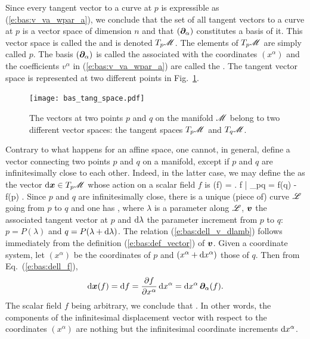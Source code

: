\ee
Since every tangent vector to a curve at $p$ is expressible as (\ref{e:bas:v_va_wpar_a}), we conclude that
the set of all tangent vectors to a curve at $p$ is a vector space of dimension $n$ and that $(\bm{\partial}_\alpha)$ constitutes a basis of it. This vector space is
called the
 and is denoted $T_p\mathscr{M}$.
The elements of $T_p\mathscr{M}$ are simply called  $p$.
The basis $(\bm{\partial}_\alpha)$ is called the  associated with
the coordinates $(x^\alpha)$ and the coefficients $v^\alpha$ in (\ref{e:bas:v_va_wpar_a}) are called the .
The tangent vector space is represented at two different points in Fig.~\ref{f:bas:tang_space}.

\begin{figure}
\centerline{\texttt{[image: bas\_tang\_space.pdf]}}
\caption[]{\label{f:bas:tang_space} \footnotesize
The vectors at two points $p$ and $q$ on the
manifold $\mathscr{M}$ belong to two different vector spaces:
the tangent spaces $T_p\mathscr{M}$ and $T_q\mathscr{M}$.}
\end{figure}

Contrary to what happens for an affine space, one cannot, in general, define a vector connecting two points $p$ and $q$ on a manifold, except if $p$ and $q$ are infinitesimally close to each other. Indeed, in the latter case, we may define
the  as the vector $\mathrm{d}\bm{x}\in{{T_p\mathscr{M}}}$ whose action on a scalar field $f$ is
\be \label{e:bas:dell_f}
  \D{}(f) = \left. \D f \right| _{p\rightarrow q} = f(q) - f(p) .
\ee
Since $p$ and $q$ are infinitesimally close, there is a unique (piece of) curve
$\mathscr{L}$ going
from $p$ to $q$ and one has
\be \label{e:bas:dell_v_dlamb}
  ,
\ee
where $\lambda$ is a parameter along $\mathscr{L}$, $\bm{v}$ the associated tangent
vector at $p$ and $\mathrm{d}\lambda$ the parameter
increment from $p$ to $q$: $p=P(\lambda)$ and $q=P(\lambda+\mathrm{d}\lambda)$.
The relation (\ref{e:bas:dell_v_dlamb}) follows immediately from the definition
(\ref{e:bas:def_vector}) of $\bm{v}$.
Given a coordinate system, let $(x^\alpha)$ be the coordinates
of $p$ and $(x^\alpha+\mathrm{d} x^\alpha)$ those of $q$. Then from Eq.~(\ref{e:bas:dell_f}),
\[
  \mathrm{d}\bm{x}(f) =   \mathrm{d} f  = \frac{\partial f}{\partial x^\alpha} \, \mathrm{d} x^\alpha
  = \mathrm{d} x^\alpha \, \bm{\partial}_\alpha(f) .
\]
The scalar field $f$ being arbitrary, we conclude that
\be \label{e:bas:dell_dxa_wpar}
   .
\ee
In other words, the components of the infinitesimal displacement vector with respect
to the coordinates $(x^\alpha)$ are nothing but the infinitesimal coordinate
increments $\mathrm{d} x^\alpha$.


